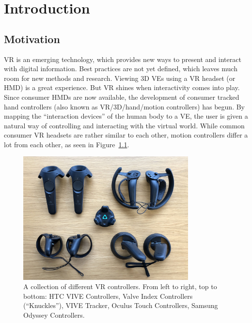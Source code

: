 \chapter{Introduction}\label{chapter:introduction}

\section{Motivation}\label{section:motivation}

\begin{sloppypar}%
  \ac{VR} is an emerging technology, which provides new ways to present and interact with digital information. Best practices are not yet defined, which leaves much room for new methods and research. Viewing \ac{3D} \acp{VE} using a \ac{VR} headset (or \ac{HMD}) is a great experience. But \ac{VR} shines when interactivity comes into play. Since consumer \acp{HMD} are now available, the development of consumer tracked hand controllers (also known as \ac{VR}/\ac{3D}/hand/motion controllers) has begun. By mapping the \enquote{interaction devices} of the human body to a \ac{VE}, the user is given a natural way of controlling and interacting with the virtual world. While common consumer \ac{VR} headsets are rather similar to each other, motion controllers differ a lot from each other, as seen in Figure~\ref{fig:vr-controllers}.
\end{sloppypar}%

\begin{figure}[H]%
  \centering%
  \includegraphics[width=9cm]{figures/introduction/vr_controllers.jpg}%
  \caption[Collection of VR controllers]{A collection of different \ac{VR} controllers. From left to right, top to bottom: HTC VIVE Controllers, Valve Index Controllers (\enquote{Knuckles}), VIVE Tracker, Oculus Touch Controllers, Samsung Odyssey Controllers.}\label{fig:vr-controllers}
\end{figure}


